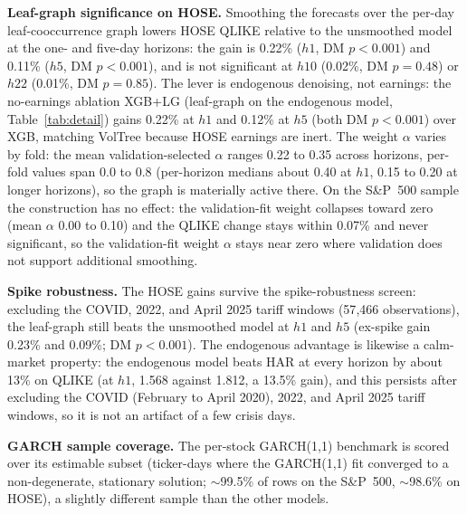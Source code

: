 \documentclass[runningheads,a4paper]{llncs}
\begin{document}
\textbf{Leaf-graph significance on HOSE.} Smoothing the forecasts over the per-day leaf-cooccurrence graph
lowers HOSE QLIKE relative to the unsmoothed model at the one- and five-day
horizons: the gain is 0.22\% ($h1$, DM $p<0.001$) and 0.11\% ($h5$, DM $p<0.001$), and is not
significant at $h10$ (0.02\%, DM $p=0.48$) or $h22$ (0.01\%, DM $p=0.85$).
The lever is endogenous denoising, not earnings: the no-earnings ablation XGB+LG (leaf-graph on the
endogenous model, Table~\ref{tab:detail}) gains 0.22\% at $h1$ and 0.12\% at $h5$ (both DM $p<0.001$) over
XGB, matching VolTree because HOSE earnings are inert.
The weight $\alpha$ varies by fold: the mean validation-selected $\alpha$ ranges 0.22 to 0.35 across
horizons, per-fold values span 0.0 to 0.8 (per-horizon medians about 0.40 at $h1$, 0.15 to 0.20 at longer
horizons), so the graph is materially active there. On the S\&P~500 sample the construction has no effect:
the validation-fit weight collapses toward zero (mean $\alpha$ 0.00 to 0.10) and the QLIKE change stays
within 0.07\% and never significant, so the validation-fit weight $\alpha$ stays near zero where validation
does not support additional smoothing.

\textbf{Spike robustness.} The HOSE gains survive the spike-robustness screen: excluding the COVID, 2022,
and April 2025 tariff windows (57{,}466 observations), the leaf-graph still beats the unsmoothed model at
$h1$ and $h5$ (ex-spike gain 0.23\% and 0.09\%; DM $p<0.001$).
The endogenous advantage is likewise a calm-market property: the endogenous model beats HAR at every
horizon by about 13\% on QLIKE (at $h1$, 1.568 against 1.812, a 13.5\% gain), and this persists after
excluding the COVID (February to April 2020), 2022, and April 2025 tariff windows, so it is not an
artifact of a few crisis days.

\textbf{GARCH sample coverage.} The per-stock GARCH(1,1) benchmark is scored over its estimable subset
(ticker-days where the GARCH(1,1) fit converged to a non-degenerate, stationary solution; $\sim$99.5\% of
rows on the S\&P~500, $\sim$98.6\% on HOSE), a slightly different sample than the other models.
\end{document}

